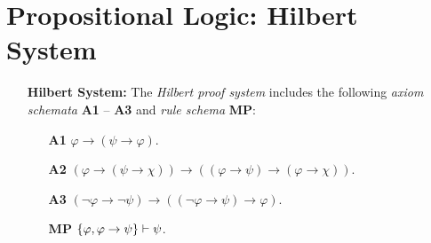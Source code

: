 \documentclass[a4paper, 11pt]{article} %
\begin{document}
\section*{\sc Propositional Logic: Hilbert System}

\begin{enumerate}[leftmargin=1.2in,labelsep=.15in] 
  \item[\bf Hilbert System:] The \textit{Hilbert proof system} includes the following \textit{axiom schemata} \textbf{A1} -- \textbf{A3} and \textit{rule schema} \textbf{MP}:
    \begin{itemize}[leftmargin=.5in]
      \item[\bf A1] $\varphi \rightarrow (\psi \rightarrow \varphi)$.
      \item[\bf A2] $(\varphi \rightarrow (\psi \rightarrow \chi)) \rightarrow ((\varphi \rightarrow \psi) \rightarrow (\varphi \rightarrow \chi))$.
      \item[\bf A3] $(\neg\varphi \rightarrow \neg\psi) \rightarrow ((\neg\varphi \rightarrow \psi) \rightarrow \varphi)$.
      \item[\bf MP] $\lbrace\varphi, \varphi \rightarrow \psi\rbrace \vdash \psi$.

\end{itemize}
\end{enumerate}
\end{document}
